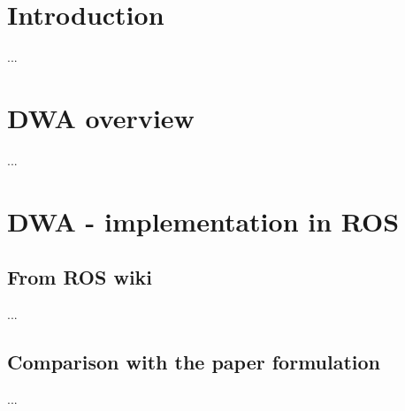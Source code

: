 \documentclass[11pt,a4paper]{article}
\begin{document}


\newpage

\renewcommand*\contentsname{Table of Contents}
\tableofcontents

\newpage




\section{Introduction}

...




\section{DWA overview}

...




\section{DWA - implementation in ROS}

\subsection{From ROS wiki}

...

\subsection{Comparison with the paper formulation}

...



\end{document}
